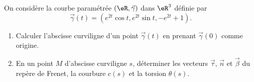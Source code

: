 \begin{exercice}\label{exoCourbesSurfaces0014}

On considère la courbe paramétrée $(\eR, \vec{\gamma})$  dans $ \eR^3$ 
définie par 
\begin{equation}
\vec{\gamma} (t) = ( e^{2t} \cos t, e^{2t} \sin t, - e^{2t} +1).
\end{equation}

\begin{enumerate}
	\item
Calculer l'abscisse curviligne d'un point $ \vec{\gamma}(t)$ en prenant $ \vec{\gamma}(0)$ comme origine.

\item
 En un point $M$ d'abscisse curviligne $s$, déterminer les vecteurs $\vec{\tau}$, $\vec{n}$ et $\vec{\beta}$ du repère de Frenet, la courbure $c(s)$ et la torsion $ \theta (s)$. 
		
\end{enumerate}


\end{exercice}
